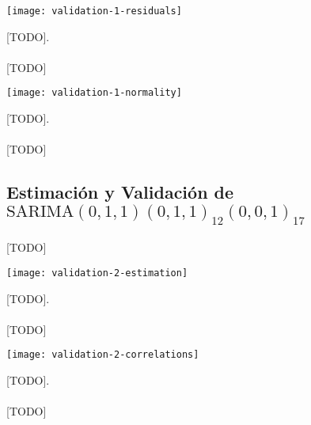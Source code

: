 \documentclass[a4paper, spanish]{article}
\begin{document}
      \begin{table}[htb!]
        \centering
        \texttt{[image: validation-1-residuals]}
        \caption{[TODO].}
        \label{}
      \end{table}

      \paragraph{}
      [TODO]

      \begin{table}[htb!]
        \centering
        \texttt{[image: validation-1-normality]}
        \caption{[TODO].}
        \label{}
      \end{table}

      \paragraph{}
      [TODO]

    \subsection{Estimación y Validación de \textbf{$\text{SARIMA}(0, 1, 1)(0, 1, 1)_{12}(0, 0, 1)_{17}$}}
    \label{sec:fitting_2}

      \paragraph{}
      [TODO]

      \begin{table}[htb!]
        \centering
        \texttt{[image: validation-2-estimation]}
        \caption{[TODO].}
        \label{}
      \end{table}

      \paragraph{}
      [TODO]

      \begin{table}[htb!]
        \centering
        \texttt{[image: validation-2-correlations]}
        \caption{[TODO].}
        \label{}
      \end{table}

      \paragraph{}
      [TODO]
\end{document}
